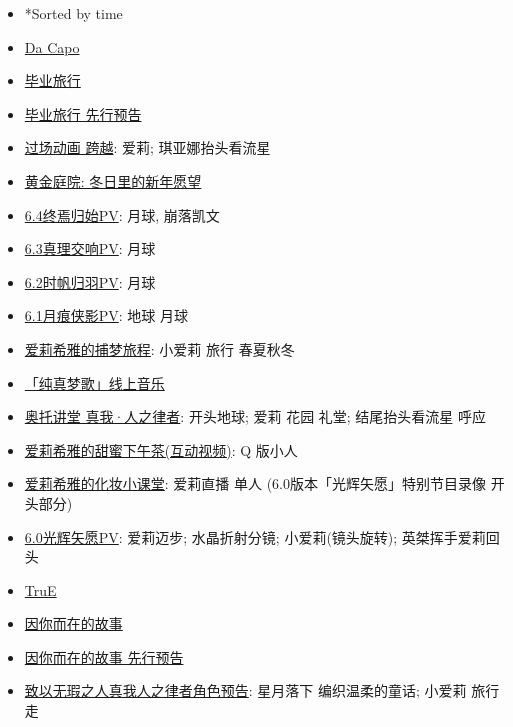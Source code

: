 \documentclass[a4paper]{article}
\begin{document}
\begin{itemize}
    \item *Sorted by time
    \item \href{https://www.bilibili.com/video/BV1aM4y1R77W/}{Da Capo}
    \item \href{https://www.bilibili.com/video/BV1Kj411g7Lu/}{毕业旅行}
    \item \href{https://www.bilibili.com/video/BV1BD4y1g7Yp/}{毕业旅行 先行预告}
    \item \href{https://www.bilibili.com/video/BV1784y1p7vM/}{过场动画 跨越}: 爱莉; 琪亚娜抬头看流星
    \item \href{https://www.bilibili.com/video/BV1oA411o7zD/}{黄金庭院: 冬日里的新年愿望}
    \item \href{https://www.bilibili.com/video/BV12g411H7sC/}{6.4终焉归始PV}: 月球, 崩落凯文
    \item \href{https://www.bilibili.com/video/BV12g411H7sC/}{6.3真理交响PV}: 月球
    \item \href{https://www.bilibili.com/video/BV1vY411f7qz/}{6.2时帆归羽PV}: 月球
    \item \href{https://www.bilibili.com/video/BV1dd4y1B7Xb/}{6.1月痕侠影PV}: 地球 月球
    \item \href{https://www.bilibili.com/video/BV1ZW4y1t7Zf/}{爱莉希雅的捕梦旅程}: 小爱莉 旅行 春夏秋冬
    \item \href{https://www.bilibili.com/bangumi/play/ep672059/}{「纯真梦歌」线上音乐}
    \item \href{https://www.bilibili.com/video/BV1q14y147EC/}{奥托讲堂 真我·人之律者}: 开头地球; 爱莉 花园 礼堂; 结尾抬头看流星 呼应
    \item \href{https://www.bilibili.com/video/BV1Ta411Z7KE/}{爱莉希雅的甜蜜下午茶(互动视频)}: Q 版小人
    \item \href{https://www.bilibili.com/video/BV12T411w7CN/}{爱莉希雅的化妆小课堂}: 爱莉直播 单人 (6.0版本「光辉矢愿」特别节目录像 开头部分)
    \item \href{https://www.bilibili.com/video/BV1Mg411k7U5/}{6.0光辉矢愿PV}: 爱莉迈步; 水晶折射分镜; 小爱莉(镜头旋转); 英桀挥手爱莉回头
    \item \href{https://www.bilibili.com/video/BV1sg411y7cZ/}{TruE}
    \item \href{https://www.bilibili.com/video/BV1fY4y1F7GL/}{因你而在的故事}
    \item \href{https://www.bilibili.com/video/BV1Ee4y1D7ci/}{因你而在的故事 先行预告}
    \item \href{https://www.bilibili.com/video/BV1DS4y1t7rs/}{致以无瑕之人真我人之律者角色预告}: 星月落下 编织温柔的童话; 小爱莉 旅行 走

\end{itemize}
\end{document}
